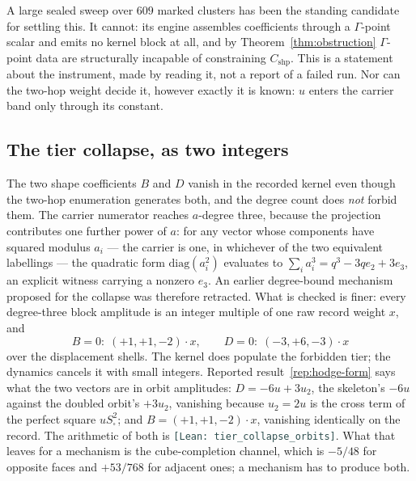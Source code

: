 \documentclass[11pt]{article}
\theoremstyle{plain}
\theoremstyle{definition}
\theoremstyle{remark}
\newcommand{\chk}[1]{}
\newcommand{\leanref}[1]{{\footnotesize\textcolor{DarkSlateGray}{\texttt{[Lean: #1]}}}}
\begin{document}
A large sealed sweep over $609$ marked clusters has been the standing candidate
for settling this. It cannot: its engine assembles coefficients through a
$\Gamma$-point scalar and emits no kernel block at all, and by
Theorem~\ref{thm:obstruction} $\Gamma$-point data are structurally incapable of
constraining $C_{\mathrm{shp}}$. This is a statement about the instrument, made
by reading it, not a report of a failed run. Nor can the two-hop weight decide
it, however exactly it is known: $u$ enters the carrier band only through its
constant.
\chk{FINDING: the marked-cluster engine emits the Gamma scalar only — a completed 609-sweep cannot decide C\_shp}

\subsection{The tier collapse, as two integers}\label{sec:tier}

The two shape coefficients $B$ and $D$ vanish in the recorded kernel even
though the two-hop enumeration generates both, and the degree count does
\emph{not} forbid them. The carrier numerator reaches $a$-degree three, because
the projection contributes one further power of $a$: for any vector whose
components have squared modulus $a_i$ --- the carrier is one, in whichever of
the two equivalent labellings --- the quadratic form $\mathrm{diag}(a_i^2)$
evaluates to $\sum_i a_i^3=q^3-3qe_2+3e_3$, an explicit witness carrying a
nonzero $e_3$. An earlier degree-bound mechanism proposed
for the collapse was therefore retracted. What is checked is finer: every
degree-three block amplitude is an integer multiple of one raw record weight
$x$, and
\[
  B=0:\;(+1,+1,-2)\cdot x,\qquad
  D=0:\;(-3,+6,-3)\cdot x
\]
over the displacement shells. The kernel does populate the forbidden tier; the
dynamics cancels it with small integers. Reported result~\ref{rep:hodge-form}
says what the two vectors are in orbit amplitudes: $D=-6u+3u_2$, the
skeleton's $-6u$ against the doubled orbit's $+3u_2$, vanishing because
$u_2=2u$ is the cross term of the perfect square $uS_\square^2$; and
$B=(+1,+1,-2)\cdot x$, vanishing identically on the record. The arithmetic
of both is \leanref{tier\_collapse\_orbits}. What that leaves for a
mechanism is the cube-completion channel, which is $-5/48$ for opposite faces
and $+53/768$ for adjacent ones; a mechanism has to produce both.
\chk{RETRACTED: the vertex count does NOT forbid B\_shp and D\_shp}
\chk{FINDING: the tier collapse is two integer cancellations at record level}
\chk{the vanishing coefficients are exactly the degree-3 ones}
\end{document}
